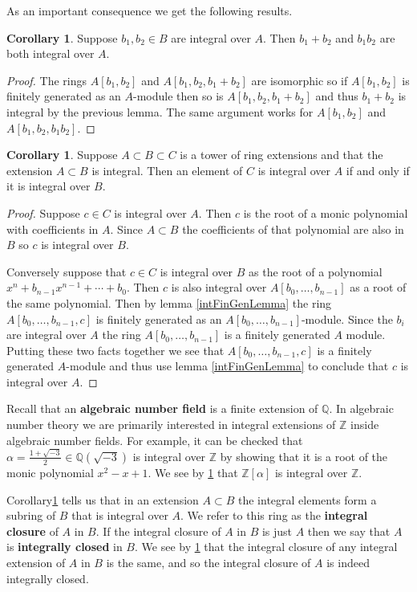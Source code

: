 \documentclass{article}
\newcommand{\Z}{\ensuremath{\mathbb{Z}}}
\newcommand{\Q}{\ensuremath{\mathbb{Q}}}
\theoremstyle{definition}
\newcounter{dummy} \numberwithin{dummy}{section}
\newtheorem{cor}[dummy]{Corollary}
\begin{document}
\noindent
As an important consequence we get the following results.
\begin{cor}
  \label{intRingProp}
  Suppose $b_1, b_2 \in B$ are integral over $A$. Then $b_1+b_2$ and $b_1 b_2$ are both integral over $A$.
\end{cor}
\begin{proof}
  The rings $A[b_1,b_2]$ and $A[b_1,b_2,b_1+b_2]$ are isomorphic so if $A[b_1,b_2]$ is finitely generated as an $A$-module then so is $A[b_1,b_2,b_1+b_2]$ and thus $b_1+b_2$ is integral by the previous lemma.
  The same argument works for $A[b_1,b_2]$ and $A[b_1,b_2,b_1b_2]$.
\end{proof}

\begin{cor}
  \label{towerProp}
  Suppose $A \subset B \subset C$ is a tower of ring extensions and that the extension $A \subset B$ is integral.
  Then an element of $C$ is integral over $A$ if and only if it is integral over $B$.
\end{cor}
\begin{proof}
  Suppose $c \in C$ is integral over $A$.
  Then $c$ is the root of a monic polynomial with coefficients in $A$.
  Since $A \subset B$ the coefficients of that polynomial are also in $B$ so $c$ is integral over $B$.

  Conversely suppose that $c \in C$ is integral over $B$ as the root of a polynomial $x^n + b_{n-1}x^{n-1} + \cdots + b_0$.
  Then $c$ is also integral over $A[b_0, \ldots, b_{n-1}]$ as a root of the same polynomial.
  Then by lemma \ref{intFinGenLemma} the ring $A[b_0, \ldots, b_{n-1},c]$ is finitely generated as an $A[b_0, \ldots, b_{n-1}]$-module.
  Since the $b_i$ are integral over $A$ the ring $A[b_0, \ldots, b_{n-1}]$ is a finitely generated $A$ module.
  Putting these two facts together we see that $A[b_0, \ldots, b_{n-1},c]$ is a finitely generated $A$-module and thus use lemma \ref{intFinGenLemma} to conclude that $c$ is integral over $A$.
\end{proof}

Recall that an \textbf{algebraic number field} is a finite extension of $\Q$.
In algebraic number theory we are primarily interested in integral extensions of $\Z$ inside algebraic number fields.
For example, it can be checked that $\alpha=\frac{1+\sqrt{-3}}{2} \in \Q(\sqrt{-3})$ is integral over $\Z$ by showing that it is a root of the monic polynomial $x^2-x+1$.
We see by \ref{intRingProp} that $\Z\left[\alpha\right]$ is integral over $\Z$.

Corollary\ref{intRingProp} tells us that in an extension $A \subset B$ the integral elements form a subring of $B$ that is integral over $A$.
We refer to this ring as the \textbf{integral closure} of $A$ in $B$.
If the integral closure of $A$ in $B$ is just $A$ then we say that $A$ is \textbf{integrally closed} in $B$.
We see by \ref{towerProp} that the integral closure of any integral extension of $A$ in $B$ is the same, and so the integral closure of $A$ is indeed integrally closed.
\end{document}
